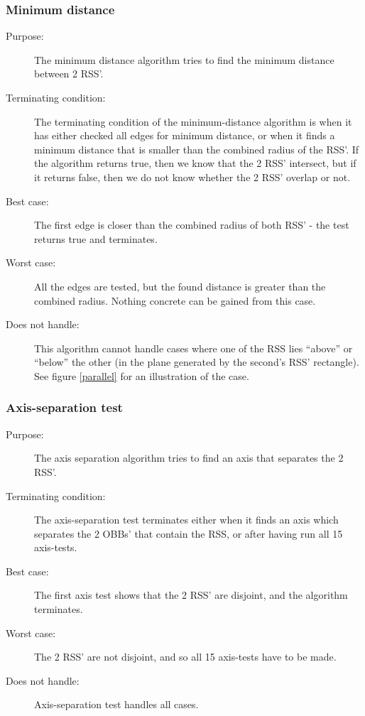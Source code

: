 \subsubsection{Minimum distance}
\begin{description}
\item[Purpose:] The minimum distance algorithm tries to find the minimum distance between 2 RSS'.
\item[Terminating condition:]The terminating condition of the minimum-distance algorithm is when it has either checked all edges for minimum distance, or when it finds a minimum distance that is smaller than the combined radius of the RSS'. If the algorithm returns true, then we know that the 2 RSS' intersect, but if it returns false, then we do not know whether the 2 RSS' overlap or not.
\item[Best case:] The first edge is closer than the combined radius of both RSS' - the test returns true and terminates.
\item[Worst case:] All the edges are tested, but the found distance is greater than the combined radius. Nothing concrete can be gained from this case.
\item[Does not handle:] This algorithm cannot handle cases where one of the RSS lies ``above'' or ``below'' the other (in the plane generated by the second's RSS' rectangle). See figure \ref{parallel} for an illustration of the case.
\end{description}

\subsubsection{Axis-separation test}
\begin{description}
\item[Purpose:] The axis separation algorithm tries to find an axis that separates the 2 RSS'. 
\item[Terminating condition:] The axis-separation test terminates either when it finds an axis which separates the 2 OBBs' that contain the RSS, or after having run all 15 axis-tests.
\item[Best case:] The first axis test shows that the 2 RSS' are disjoint, and the algorithm terminates. 
\item[Worst case:] The 2 RSS' are not disjoint, and so all 15 axis-tests have to be made.
\item[Does not handle:] Axis-separation test handles all cases.
\end{description}

